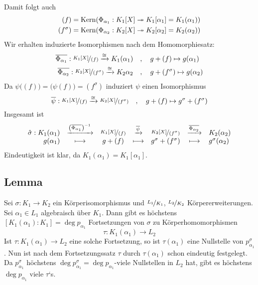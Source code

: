 Damit folgt auch
\begin{align*}
	(f) &= \Kern \enbrace*{\Phi_{\alpha_1} : K_1[X] \twoheadrightarrow K_1[\alpha_1] = K_1(\alpha_1) }\\
	(f^\sigma) &= \Kern \enbrace*{\Phi_{\alpha_2} : K_2[X] \twoheadrightarrow K_2[\alpha_2] = K_2(\alpha_2)}
\end{align*}
Wir erhalten induzierte Isomorphismen nach dem Homomorphiesatz:
\begin{align*}
	\overline{\Phi_{\alpha_1}} : \nicefrac{K_1[X]}{(f)} \xrightarrow{\cong} K_1(\alpha_1) \quad &, \quad g+(f) \mapsto g(\alpha_1) \\
	\overline{\Phi_{\alpha_2}} : \nicefrac{K_2[X]}{(f^\sigma)} \xrightarrow{\cong} K_2{\alpha_2} \quad &, \quad g+ (f^\sigma) \mapsto g(\alpha_2)     
\end{align*}
Da $\psi\big((f)\big)= \big(\psi(f)\big) = (f^\sigma)$ induziert $\psi$ einen Isomorphismus
\[
	\overline{\psi} : \nicefrac{K_1[X]}{(f)} \xrightarrow{\cong} \nicefrac{K_2[X]}{(f^\sigma)} \quad , \quad g+ (f) \mapsto g^\sigma + (f^\sigma)  
\]
Insgesamt ist 
\[
	\begin{array}{rcccccl}
		\hat \sigma : K_1(\alpha_1) &\xrightarrow{\enbrace*{\overline{\Phi_{\alpha_1} } }^{-1}} & \nicefrac{K_1[X]}{(f)} & \xrightarrow{\overline{\psi}} & \nicefrac{K_2[X]}{(f^\sigma)} & \xrightarrow{\overline{\Phi_{\alpha_2}} }& K_2(\alpha_2) \\
		   g(\alpha_1) &\longmapsto & g+ (f) &\longmapsto &g^\sigma + (f^\sigma) &\longmapsto &g^\sigma(\alpha_2)
	\end{array}
\]
Eindeutigkeit ist klar, da $K_1(\alpha_1)=K_1[\alpha_1]$. \bewende

\subsection[Lemma: Anzahl der möglichen Fortsetzungen eines Isomorphismus von Körpern]{Lemma} %
\label{sub:1410}
Sei $\sigma : K_1 \to K_2$ ein Körperisomorphismus und $\nicefrac{L_1}{K_1}$, $\nicefrac{L_2}{K_2}$ Körpererweiterungen. Sei $\alpha_1 \in L_1$ algebraisch über $K_1$.
Dann gibt es höchstens $[K_1(\alpha_1) :K_1] = \deg p_{\alpha_1}$ Fortsetzungen von $\sigma$ zu Körperhomomorphismen
\[
	\tau : K_1(\alpha_1) \to L_2
\] 
Ist $\tau : K_1(\alpha_1) \to L_2$ eine solche Fortsetzung, so ist $\tau(\alpha_1)$ eine Nullstelle von $p_{\alpha_1}^\sigma$. Nun ist nach dem Fortsetzungssatz $\tau$
durch $\tau(\alpha_1)$ schon eindeutig festgelegt. Da $p_{\alpha_1}^\sigma$ höchstens $\deg p_{\alpha_1}^\sigma = \deg p_{\alpha_1}$-viele Nullstellen in $L_2$ hat, gibt
es höchstens $\deg p_{\alpha_1}$ viele $\tau$`s. \bewende

